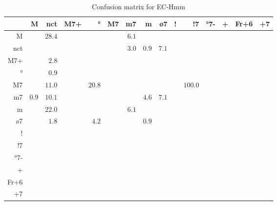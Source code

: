 \documentclass{article}
\begin{document}
\begin{table}
\begin{center}
\begin{tabular}{r|r|r|r|r|r|r|r|r|r|r|r|r|r|r}
       & M & nct & M7+ & ° & M7 & m7 & m & ø7 & ! & !7 & °7- & + & Fr+6 & +7 \\ \hline
 M & $ $ & $28.4$ & $ $ & $ $ & $ $ & $6.1$ & $ $ & $ $ & $ $ & $ $ & $ $ & $ $ & $ $ & $ $  \\ \hline
 nct & $ $ & $ $ & $ $ & $ $ & $ $ & $3.0$ & $0.9$ & $7.1$ & $ $ & $ $ & $ $ & $ $ & $ $ & $ $  \\ \hline
 M7+ & $ $ & $2.8$ & $ $ & $ $ & $ $ & $ $ & $ $ & $ $ & $ $ & $ $ & $ $ & $ $ & $ $ & $ $  \\ \hline
 ° & $ $ & $0.9$ & $ $ & $ $ & $ $ & $ $ & $ $ & $ $ & $ $ & $ $ & $ $ & $ $ & $ $ & $ $  \\ \hline
 M7 & $ $ & $11.0$ & $ $ & $20.8$ & $ $ & $ $ & $ $ & $ $ & $ $ & $100.0$ & $ $ & $ $ & $ $ & $ $  \\ \hline
 m7 & $0.9$ & $10.1$ & $ $ & $ $ & $ $ & $ $ & $4.6$ & $7.1$ & $ $ & $ $ & $ $ & $ $ & $ $ & $ $  \\ \hline
 m & $ $ & $22.0$ & $ $ & $ $ & $ $ & $6.1$ & $ $ & $ $ & $ $ & $ $ & $ $ & $ $ & $ $ & $ $  \\ \hline
 ø7 & $ $ & $1.8$ & $ $ & $4.2$ & $ $ & $ $ & $0.9$ & $ $ & $ $ & $ $ & $ $ & $ $ & $ $ & $ $  \\ \hline
 ! & $ $ & $ $ & $ $ & $ $ & $ $ & $ $ & $ $ & $ $ & $ $ & $ $ & $ $ & $ $ & $ $ & $ $  \\ \hline
 !7 & $ $ & $ $ & $ $ & $ $ & $ $ & $ $ & $ $ & $ $ & $ $ & $ $ & $ $ & $ $ & $ $ & $ $  \\ \hline
 °7- & $ $ & $ $ & $ $ & $ $ & $ $ & $ $ & $ $ & $ $ & $ $ & $ $ & $ $ & $ $ & $ $ & $ $  \\ \hline
 + & $ $ & $ $ & $ $ & $ $ & $ $ & $ $ & $ $ & $ $ & $ $ & $ $ & $ $ & $ $ & $ $ & $ $  \\ \hline
 Fr+6 & $ $ & $ $ & $ $ & $ $ & $ $ & $ $ & $ $ & $ $ & $ $ & $ $ & $ $ & $ $ & $ $ & $ $  \\ \hline
 +7 & $ $ & $ $ & $ $ & $ $ & $ $ & $ $ & $ $ & $ $ & $ $ & $ $ & $ $ & $ $ & $ $ & $ $  \\ \hline
\end{tabular}
\caption{Confusion matrix for EC-Hmm}
\end{center}
\end{table}
\end{document}

